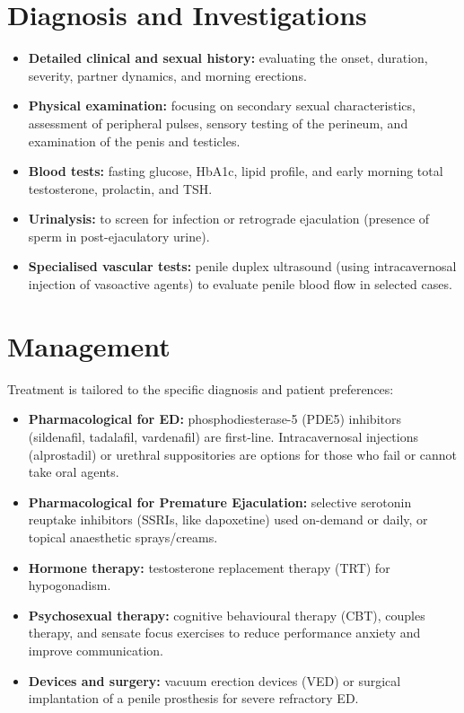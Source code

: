 \section*{Diagnosis and Investigations}
\begin{itemize}
    \item \textbf{Detailed clinical and sexual history:} evaluating the onset, duration, severity, partner dynamics, and morning erections.
    \item \textbf{Physical examination:} focusing on secondary sexual characteristics, assessment of peripheral pulses, sensory testing of the perineum, and examination of the penis and testicles.
    \item \textbf{Blood tests:} fasting glucose, HbA1c, lipid profile, and early morning total testosterone, prolactin, and TSH.
    \item \textbf{Urinalysis:} to screen for infection or retrograde ejaculation (presence of sperm in post-ejaculatory urine).
    \item \textbf{Specialised vascular tests:} penile duplex ultrasound (using intracavernosal injection of vasoactive agents) to evaluate penile blood flow in selected cases.
\end{itemize}

\section*{Management}
Treatment is tailored to the specific diagnosis and patient preferences:

\begin{itemize}
    \item \textbf{Pharmacological for ED:} phosphodiesterase-5 (PDE5) inhibitors (sildenafil, tadalafil, vardenafil) are first-line. Intracavernosal injections (alprostadil) or urethral suppositories are options for those who fail or cannot take oral agents.
    \item \textbf{Pharmacological for Premature Ejaculation:} selective serotonin reuptake inhibitors (SSRIs, like dapoxetine) used on-demand or daily, or topical anaesthetic sprays/creams.
    \item \textbf{Hormone therapy:} testosterone replacement therapy (TRT) for hypogonadism.
    \item \textbf{Psychosexual therapy:} cognitive behavioural therapy (CBT), couples therapy, and sensate focus exercises to reduce performance anxiety and improve communication.
    \item \textbf{Devices and surgery:} vacuum erection devices (VED) or surgical implantation of a penile prosthesis for severe refractory ED.
\end{itemize}

